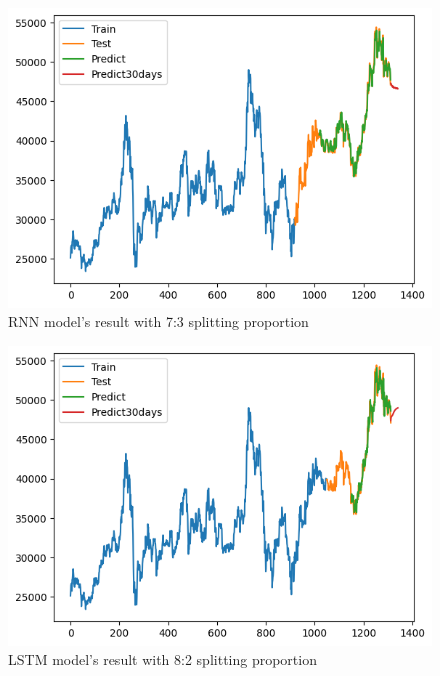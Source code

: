 \documentclass{ieeeojies}
\begin{document}
\begin{figure}[H]
  \centering
  \begin{minipage}{0.6\linewidth}
    \centering
    \includegraphics[width=\linewidth]{bibliography/diagram/RNN-BID.png}
    \caption{RNN model’s result with 7:3 splitting proportion}
    \label{fig8}
  \end{minipage}
\end{figure}

\begin{figure}[H]
  \centering
  \begin{minipage}{0.6\linewidth}
    \centering
    \includegraphics[width=\linewidth]{bibliography/diagram/LSTM-BID.png}
    \caption{LSTM model’s result with 8:2 splitting proportion}
    \label{fig8}
  \end{minipage}
\end{figure}
\end{document}
